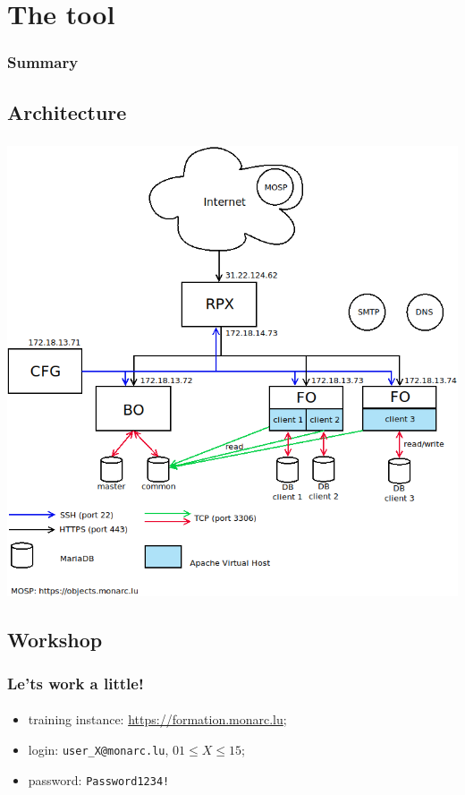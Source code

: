 %
%
\section{The tool}
\begin{frame}
    \frametitle{Summary}
\end{frame}
\subsection{Architecture}
\begin{frame}
    \frametitle{}
    \framesubtitle{}
    \begin{center}
        \includegraphics[scale=0.3]{./images/monarc-architecture.png}
    \end{center}
\end{frame}



\subsection{Workshop}
\begin{frame}
    \frametitle{Le'ts work a little!}
    \framesubtitle{}
    \begin{itemize}
        \item training instance: \url{https://formation.monarc.lu};
        \item login: \texttt{user\_X@monarc.lu}, $01 \leq X \leq 15$;
        \item password: \texttt{Password1234!}
    \end{itemize}
\end{frame}



